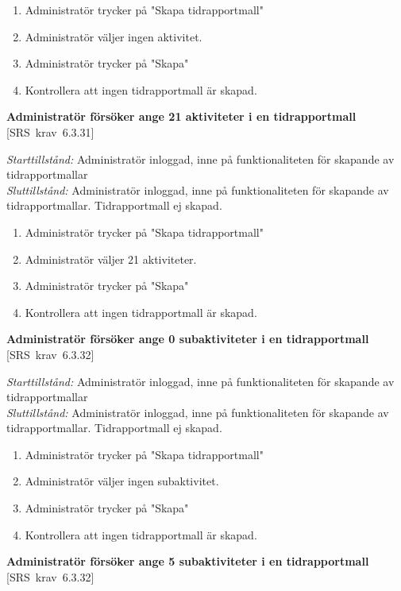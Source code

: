 \documentclass[a4paper]{article}
\def\reqinside{\hfil\penalty 100 \hfilneg \hbox}
\def \req [#1]{\reqinside{[SRS krav #1]}}
\begin{document}
\begin{FT}
\begin{enumerate}
\item Administratör trycker på "Skapa tidrapportmall"
\item Administratör väljer ingen aktivitet.
\item Administratör trycker på "Skapa"
\item Kontrollera att ingen tidrapportmall är skapad.
\end{enumerate}

\item
\textbf{Administratör försöker ange 21 aktiviteter i en tidrapportmall} \req[6.3.31]

\emph{Starttillstånd:} Administratör inloggad, inne på funktionaliteten för skapande av tidrapportmallar\\
\emph{Sluttillstånd:} Administratör inloggad, inne på funktionaliteten för skapande av tidrapportmallar. Tidrapportmall ej skapad.\\

\begin{enumerate}
\item Administratör trycker på "Skapa tidrapportmall"
\item Administratör väljer 21 aktiviteter.
\item Administratör trycker på "Skapa"
\item Kontrollera att ingen tidrapportmall är skapad.
\end{enumerate}


\item
\textbf{Administratör försöker ange 0 subaktiviteter i en tidrapportmall} \req[6.3.32]

\emph{Starttillstånd:} Administratör inloggad, inne på funktionaliteten för skapande av tidrapportmallar\\
\emph{Sluttillstånd:} Administratör inloggad, inne på funktionaliteten för skapande av tidrapportmallar. Tidrapportmall ej skapad.\\

\begin{enumerate}
\item Administratör trycker på "Skapa tidrapportmall"
\item Administratör väljer ingen subaktivitet.
\item Administratör trycker på "Skapa"
\item Kontrollera att ingen tidrapportmall är skapad.
\end{enumerate}


\item
\textbf{Administratör försöker ange 5 subaktiviteter i en tidrapportmall} \req[6.3.32]


\end{FT}
\end{document}
